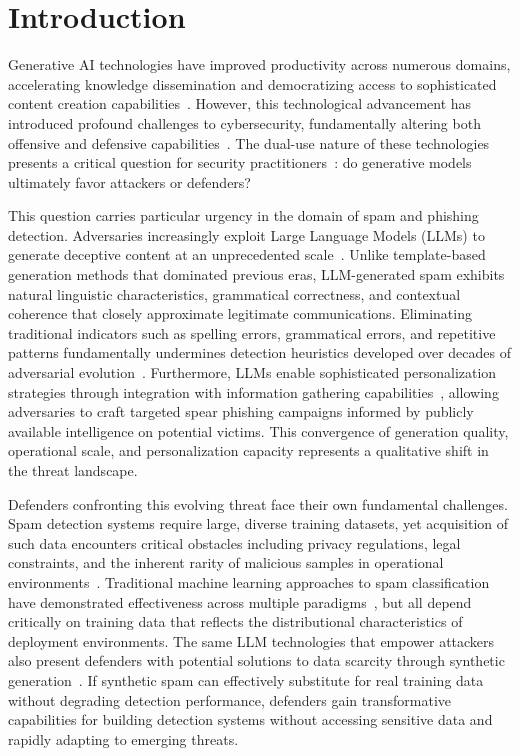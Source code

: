 \section{Introduction}
\label{sec:introduction}

Generative AI technologies have improved productivity across numerous domains, accelerating knowledge dissemination and democratizing access to sophisticated content creation capabilities~\cite{baldassarre2023social}. However, this technological advancement has introduced profound challenges to cybersecurity, fundamentally altering both offensive and defensive capabilities~\cite{wach2023dark}. The dual-use nature of these technologies presents a critical question for security practitioners~\cite{korimilli2025dual,mirtaheric2025cybersecurity}: do generative models ultimately favor attackers or defenders?

This question carries particular urgency in the domain of spam and phishing detection. Adversaries increasingly exploit Large Language Models (LLMs) to generate deceptive content at an unprecedented scale~\cite{bethany2024large,weinz2025impact}. Unlike template-based generation methods that dominated previous eras, LLM-generated spam exhibits natural linguistic characteristics, grammatical correctness, and contextual coherence that closely approximate legitimate communications. Eliminating traditional indicators such as spelling errors, grammatical errors, and repetitive patterns fundamentally undermines detection heuristics developed over decades of adversarial evolution~\cite{magdy2022efficient}. Furthermore, LLMs enable sophisticated personalization strategies through integration with information gathering capabilities~\cite{yu2025survey,kim2025llms}, allowing adversaries to craft targeted spear phishing campaigns informed by publicly available intelligence on potential victims. This convergence of generation quality, operational scale, and personalization capacity represents a qualitative shift in the threat landscape.

Defenders confronting this evolving threat face their own fundamental challenges. Spam detection systems require large, diverse training datasets, yet acquisition of such data encounters critical obstacles including privacy regulations, legal constraints, and the inherent rarity of malicious samples in operational environments~\cite{bazzaz2021hybrid}. Traditional machine learning approaches to spam classification have demonstrated effectiveness across multiple paradigms~\cite{wang2025hybrid}, but all depend critically on training data that reflects the distributional characteristics of deployment environments. The same LLM technologies that empower attackers also present defenders with potential solutions to data scarcity through synthetic generation~\cite{zhang2025llms}. If synthetic spam can effectively substitute for real training data without degrading detection performance, defenders gain transformative capabilities for building detection systems without accessing sensitive data and rapidly adapting to emerging threats.


